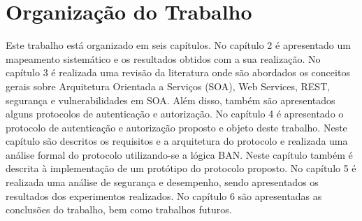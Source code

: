 \section{Organização do Trabalho}

Este trabalho está organizado em seis capítulos. No capítulo 2 é apresentado um mapeamento sistemático e os resultados obtidos com a sua realização. No capítulo 3 é realizada uma revisão da literatura onde são abordados os conceitos gerais sobre Arquitetura Orientada a Serviços (SOA), Web Services, REST, segurança e vulnerabilidades em SOA. Além disso, também são apresentados alguns protocolos de autenticação e autorização. No capítulo 4 é apresentado o protocolo de autenticação e autorização proposto e objeto deste trabalho. Neste capítulo são descritos os requisitos e a arquitetura do protocolo e realizada uma análise formal do protocolo utilizando-se a lógica BAN. Neste capítulo também é descrita à implementação de um protótipo do protocolo proposto. No capítulo 5 é realizada uma análise de segurança e desempenho, sendo apresentados os resultados dos experimentos realizados. No capítulo 6 são apresentadas as conclusões do trabalho, bem como trabalhos futuros. 